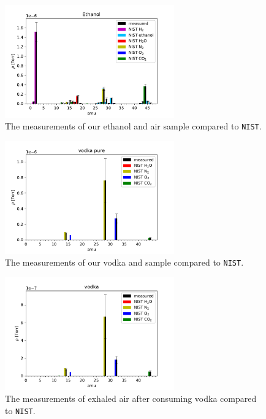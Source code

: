     \begin{figure}[h!]
    \centering
    \includegraphics[width=0.65\textwidth]{Report/DataResultsPlots/ethanol.pdf}
    \caption{The measurements of our ethanol and air sample compared to \texttt{NIST}.}
    \label{fig:ethanol2}
    \end{figure}
    
    
    \begin{figure}[h!]
    \centering
    \includegraphics[width=0.65\textwidth]{Report/DataResultsPlots/vodka pure.pdf}
    \caption{The measurements of our vodka and sample compared to \texttt{NIST}.}
    \label{fig:vodka}
    \end{figure}
    
    \begin{figure}[h!]
    \centering
    \includegraphics[width=0.65\textwidth]{Report/DataResultsPlots/vodka.pdf}
    \caption{The measurements of exhaled air after consuming vodka compared to \texttt{NIST}.}
    \label{fig:vodka_air}
    \end{figure}
    

